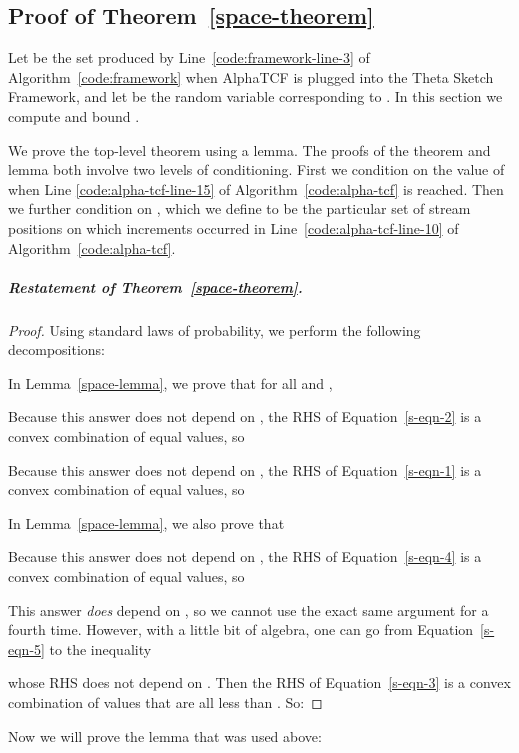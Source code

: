 \documentclass{article}
\begin{document}
\subsection{Proof of Theorem~\ref{space-theorem}}\label{appendix-proof-of-space-theorem}

Let  be the set produced by 
Line~\ref{code:framework-line-3}
of
Algorithm~\ref{code:framework}
when AlphaTCF is plugged
into the Theta Sketch Framework, 
and let  be the random variable corresponding to .
In this section we compute  and bound . 

We prove the top-level theorem using a lemma. The proofs of the theorem and lemma
both involve two levels of conditioning. First we condition on the value  of  when 
Line \ref{code:alpha-tcf-line-15} of 
Algorithm~\ref{code:alpha-tcf} is reached.
Then we further condition on , which we define to be the
particular set of  stream positions on which increments occurred in 
Line~\ref{code:alpha-tcf-line-10} of Algorithm~\ref{code:alpha-tcf}.

\subparagraph*{Restatement of Theorem~\ref{space-theorem}.}




\begin{proof}
Using standard laws of probability, we perform the following decompositions:

In Lemma~\ref{space-lemma}, we prove that for all  and ,

Because this answer does not depend on , the RHS of 
Equation~\eqref{s-eqn-2} is a convex combination of equal values, so

Because this answer does not depend on , the RHS of 
Equation~\eqref{s-eqn-1} is a convex combination of equal values, so

In Lemma~\ref{space-lemma}, we also prove that

Because this answer does not depend on , the RHS of 
Equation~\eqref{s-eqn-4} is a convex combination of equal values, so

This answer {\em does} depend on , so we cannot use the exact same argument for a fourth time.
However, with a little bit of algebra, one can go from Equation~\eqref{s-eqn-5} to the inequality

whose RHS does not depend on . Then the RHS of Equation~\eqref{s-eqn-3}
is a convex combination of values that are all less than 
. So:

\end{proof}

\noindent Now we will prove the lemma that was used above:
\end{document}

